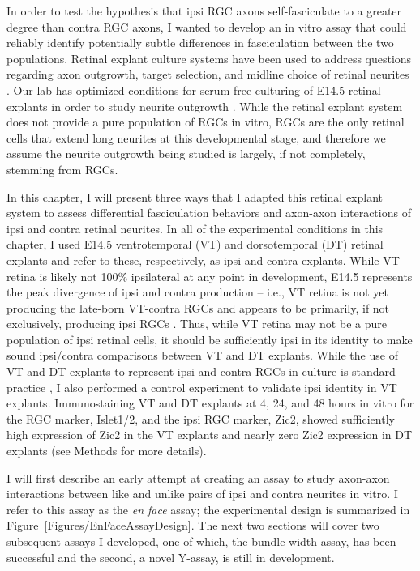 In order to test the hypothesis that ipsi RGC axons self-fasciculate to a greater degree than contra RGC axons, I wanted to develop an in vitro assay that could reliably identify potentially subtle differences in fasciculation between the two populations.
Retinal explant culture systems have been used to address questions regarding axon outgrowth, target selection, and midline choice of retinal neurites \cite[e.g.][]{kuwajima2012optic,wang1996chemosuppression,bonhoeffer1985position}.
Our lab has optimized conditions for serum-free culturing of E14.5 retinal explants in order to study neurite outgrowth \cite[e.g.][]{kuwajima2012optic,petros2010ephrin,wang1996chemosuppression}.
While the retinal explant system does not provide a pure population of RGCs in vitro, RGCs are the only retinal cells that extend long neurites at this developmental stage, and therefore we assume the neurite outgrowth being studied is largely, if not completely, stemming from RGCs.

In this chapter, I will present three ways that I adapted this retinal explant system to assess differential fasciculation behaviors and axon-axon interactions of ipsi and contra retinal neurites.
In all of the experimental conditions in this chapter, I used E14.5 ventrotemporal (VT) and dorsotemporal (DT) retinal explants and refer to these, respectively, as ipsi and contra explants.
While VT retina is likely not 100\% ipsilateral at any point in development, E14.5 represents the peak divergence of ipsi and contra production -- i.e., VT retina is not yet producing the late-born VT-contra RGCs and appears to be primarily, if not exclusively, producing ipsi RGCs \cite{drager1985birth}.
Thus, while VT retina may not be a pure population of ipsi retinal cells, it should be sufficiently ipsi in its identity to make sound ipsi/contra comparisons between VT and DT explants.
While the use of VT and DT explants to represent ipsi and contra RGCs in culture is standard practice \cite[e.g.][]{kuwajima2012optic,petros2010ephrin}, I also performed a control experiment to validate ipsi identity in VT explants.
Immunostaining VT and DT explants at 4, 24, and 48 hours in vitro for the RGC marker, Islet1/2, and the ipsi RGC marker, Zic2, showed sufficiently high expression of Zic2 in the VT explants and nearly zero Zic2 expression in DT explants (see Methods for more details).

I will first describe an early attempt at creating an assay to study axon-axon interactions between like and unlike pairs of ipsi and contra neurites in vitro.
I refer to this assay as the \emph{en face} assay; the experimental design is summarized in Figure~\ref{Figures/EnFaceAssayDesign}.
The next two sections will cover two subsequent assays I developed, one of which, the bundle width assay, has been successful and the second, a novel Y-assay, is still in development.

